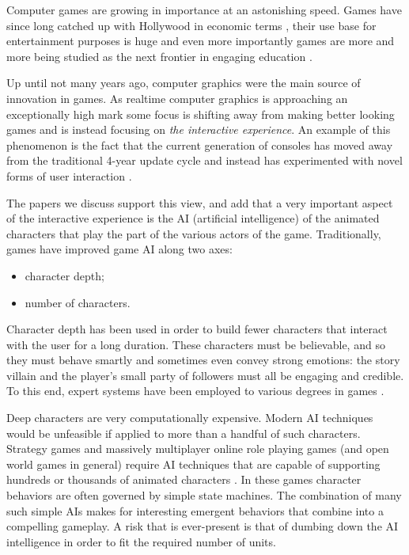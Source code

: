 %
%


Computer games are growing in importance at an astonishing speed. Games have since long catched up with Hollywood in economic terms \cite{3}, their use base for entertainment purposes is huge \cite{MILLIONS_USERS} and even more importantly games are more and more being studied as the next frontier in engaging education \cite{FUN_IO,GAMES_FIRST_APPROACH}.

Up until not many years ago, computer graphics were the main source of innovation in games. As realtime computer graphics is approaching an exceptionally high mark some focus is shifting away from making better looking games and is instead focusing on \textit{the interactive experience}. An example of this phenomenon is the fact that the current generation of consoles has moved away from the traditional 4-year update cycle and instead has experimented with novel forms of user interaction \cite{KINECT}.

The papers we discuss \cite{SGL1,SGL2,SGL3,SGL4} support this view, and add that a very important aspect of the interactive experience is the AI (artificial intelligence) of the animated characters that play the part of the various actors of the game. Traditionally, games have improved game AI along two axes:

\begin{itemize}
\item character depth;
\item number of characters.
\end{itemize}

Character depth has been used in order to build fewer characters that interact with the user for a long duration. These characters must be believable, and so they must behave smartly and sometimes even convey strong emotions: the story villain and the player's small party of followers must all be engaging and credible. To this end, expert systems have been employed to various degrees in games \cite{14,12,17}.

Deep characters are very computationally expensive. Modern AI techniques would be unfeasible if applied to more than a handful of such characters. Strategy games and massively multiplayer online role playing games (and open world games in general) require AI techniques that are capable of supporting hundreds or thousands of animated characters \cite{2,23}. In these games character behaviors are often governed by simple state machines. The combination of many such simple AIs makes for interesting emergent behaviors that combine into a compelling gameplay. A risk that is ever-present is that of dumbing down the AI intelligence in order to fit the required number of units. 


